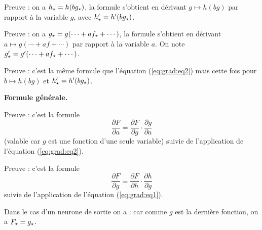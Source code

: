 Preuve : on a $h_\star = h(b g_\star)$, la formule s'obtient en dérivant $g \mapsto h(bg)$ par rapport à la variable $g$, avec 
$h'_\star = h'(b g_\star)$.

Preuve : on a $g_\star = g(\cdots + a f_\star+\cdots)$, la formule s'obtient en dérivant $a \mapsto g(\cdots + a f +\cdots)$ par rapport à la variable $a$. On note $g'_\star = g'(\cdots + a f_\star+\cdots)$.

Preuve : c'est la même formule que l'équation (\ref{eq:grad:eq2}) mais cette fois pour $b \mapsto h(b g)$ et $h'_\star = h'(b g_\star)$.

\bigskip
\textbf{Formule générale.}


Preuve :
c'est la formule
$$\frac{\partial F}{\partial a} =  \frac{\partial F}{\partial g} \cdot \frac{\partial g}{\partial a}$$
(valable car $g$ est une fonction d'une seule variable) suivie de l'application de l'équation (\ref{eq:grad:eq2}).


Preuve :
c'est la formule
$$\frac{\partial F}{\partial g} =  \frac{\partial F}{\partial h} \cdot \frac{\partial h}{\partial g}$$
suivie de l'application de l'équation (\ref{eq:grad:eq1}).

Dans le cas d'un neurone de sortie on a :
car comme $g$ est la dernière fonction, on a $F_\star = g_\star$.

